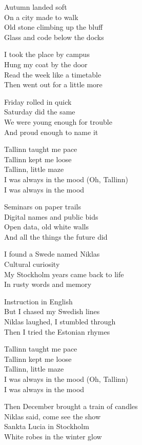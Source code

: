 \begin{lyrics}
Autumn landed soft\\
On a city made to walk\\
Old stone climbing up the bluff\\
Glass and code below the docks

I took the place by campus\\
Hung my coat by the door\\
Read the week like a timetable\\
Then went out for a little more

Friday rolled in quick\\
Saturday did the same\\
We were young enough for trouble\\
And proud enough to name it

Tallinn taught me pace\\
Tallinn kept me loose\\
Tallinn, little maze\\
I was always in the mood
(Oh, Tallinn)\\
I was always in the mood

Seminars on paper trails\\
Digital names and public bids\\
Open data, old white walls\\
And all the things the future did

I found a Swede named Niklas\\
Cultural curiosity\\
My Stockholm years came back to life\\
In rusty words and memory

Instruction in English\\
But I chased my Swedish lines\\
Niklas laughed, I stumbled through\\
Then I tried the Estonian rhymes

Tallinn taught me pace\\
Tallinn kept me loose\\
Tallinn, little maze\\
I was always in the mood
(Oh, Tallinn)\\
I was always in the mood

Then December brought a train of candles\\
Niklas said, come see the show\\
Sankta Lucia in Stockholm\\
White robes in the winter glow


\end{lyrics}
